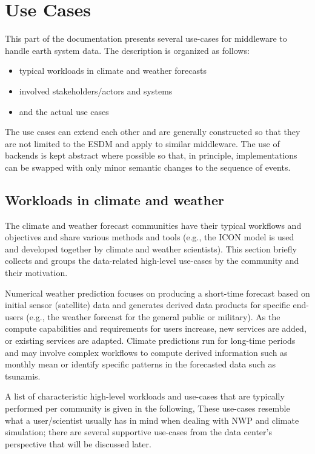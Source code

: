 \section{Use Cases}
This part of the documentation presents several use-cases for middleware to handle earth system data.
The description is organized as follows:

\begin{itemize}
  \item typical workloads in climate and weather forecasts
  \item involved stakeholders/actors and systems
  \item and the actual use cases
\end{itemize}

The use cases can extend each other and are generally constructed so that they are not limited to the ESDM and apply to similar middleware. 
The use of backends is kept abstract where possible so that, in principle, implementations can be swapped with only minor semantic changes to the sequence of events.

\subsection{Workloads in climate and weather}
The climate and weather forecast communities have their typical workflows and objectives and share various methods and tools (e.g., the ICON model is used and developed together by climate and weather scientists).
This section briefly collects and groups the data-related high-level use-cases by the community and their motivation.

Numerical weather prediction focuses on producing a short-time forecast based on initial sensor (satellite) data and generates derived data products for specific end-users (e.g., the weather forecast for the general public or military). 
As the compute capabilities and requirements for users increase, new services are added, or existing services are adapted.
Climate predictions run for long-time periods and may involve complex workflows to compute derived information such as monthly mean or identify specific patterns in the forecasted data such as tsunamis.

A list of characteristic high-level workloads and use-cases that are typically performed per community is given in the following, 
These use-cases resemble what a user/scientist usually has in mind when dealing with NWP and climate simulation; there are several supportive use-cases from the data center's perspective that will be discussed later.

